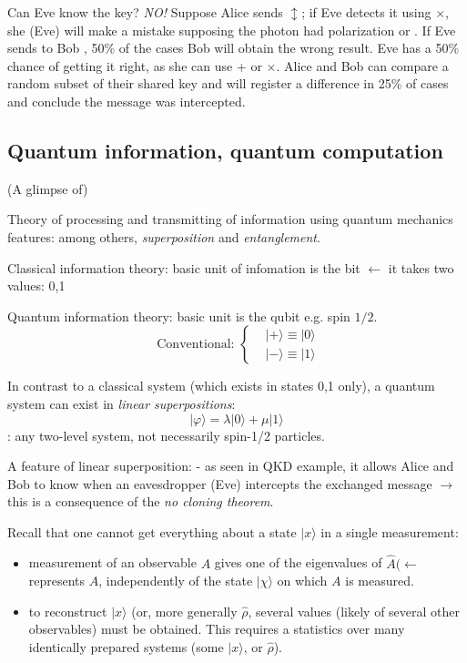 \documentclass[12pt]{article}
\newcommand{\be}{\begin{equation}}
\newcommand{\ee}{\end{equation}}
\newcommand{\polv}{\ensuremath{\updownarrow}}
\newcommand{\poldr}{\rotatebox[origin=c]{45}{\ensuremath{\leftrightarrow}}}
\newcommand{\poldl}{\rotatebox[origin=c]{-45}{\ensuremath{\leftrightarrow}}}
\begin{document}
Can Eve know the key? \emph{NO!}
Suppose Alice sends \polv; if Eve detects it 
using $\times$, she (Eve) will make a mistake
supposing the photon had polarization \poldr or \poldl.
If Eve sends to Bob \poldr, 50\% of
the cases Bob will obtain the wrong result.
Eve has a 50\% chance of getting it
right, as she can use + or $\times$.
Alice and Bob 
%
can compare a random subset of their shared key and
%
will register 
a difference in 25\% of cases and
conclude the message was intercepted.



\subsection{Quantum information, quantum computation}

(A glimpse of)

Theory of processing and transmitting of information
using quantum mechanics features: among others,
\emph{superposition} and \emph{entanglement}.

Classical information theory: basic unit of infomation is
the bit \(\leftarrow\) it takes two values: 0,1

Quantum information theory: basic unit is the qubit
e.g. spin \(1 / 2\).
\be
\text { Conventional: }
\left\{
\begin{aligned}  
&|+\rangle \equiv|0\rangle \\ 
&|-\rangle \equiv|1\rangle 
\end{aligned}
\right.
\ee

In contrast to a classical system (which exists
in states 0,1 only), a quantum system can
exist in \emph{linear superpositions}:
\be
|\varphi\rangle=\lambda|0\rangle+\mu|1\rangle
\ee
{}: any two-level system,
not necessarily spin-1/2 particles.


A feature of linear superposition:
- as seen in QKD example, it allows Alice and
Bob to know when an eavesdropper (Eve)
intercepts the exchanged message $\rightarrow$
this is a consequence of the
\emph{no cloning theorem}.

Recall that one cannot get everything about a
state \(|x\rangle\) in a single measurement:
\begin{itemize}
\item measurement of an observable \(A\) gives
one of the eigenvalues of \(\hat{A}(\leftarrow\) represents $A$,
independently of the state \(|\chi\rangle\) on which
$A$ is measured.
\item to reconstruct \(|x\rangle\) (or, more generally \(\hat{\rho}\),
several values (likely of several other observables)
must be obtained.
This requires a statistics over
many identically prepared
systems (some \(|x\rangle\), or \(\hat{\rho}\)).
\end{itemize}
\end{document}

